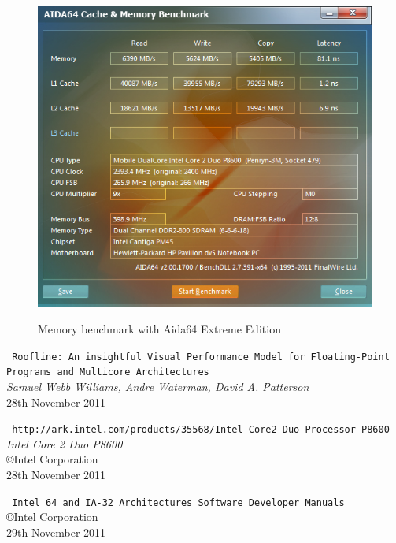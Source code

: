 \documentclass[a4paper,10pt]{report}
\begin{document}
\begin{figure}[!htp]
\includegraphics[width=12cm]{images/aida64.png}
\label{fig:aida64}
\caption[Memory benchmark]{Memory benchmark with Aida64 Extreme Edition}
\end{figure}

\appendix

\begin{thebibliography}{9}
	\texttt{\small
	Roofline: An insightful Visual Performance Model for Floating-Point Programs and Multicore Architectures}	\\
	\emph{Samuel Webb Williams, Andre Waterman, David A. Patterson}	\\
	28th November 2011

	\texttt{\small
	http://ark.intel.com/products/35568/Intel-Core2-Duo-Processor-P8600}	\\
	\emph{Intel{\textregistered} Core 2 Duo{\texttrademark} P8600}	\\
	{\copyright}Intel Corporation	\\
	28th November 2011

	\texttt{\small
	Intel{\textregistered} 64 and IA-32 Architectures Software Developer Manuals}	\\
	{\copyright}Intel Corporation	\\
	29th November 2011

\end{thebibliography}
\end{document}
